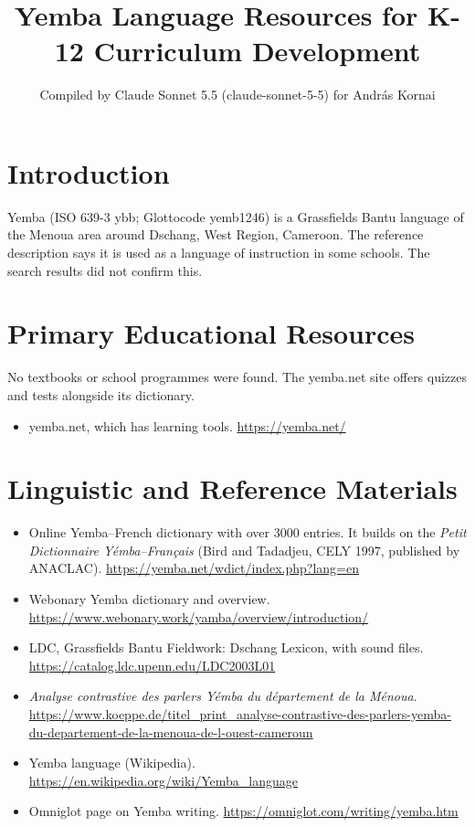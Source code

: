 \documentclass[12pt]{article}
\title{Yemba Language Resources for K-12 Curriculum Development}
\author{Compiled by Claude Sonnet 5.5 (claude-sonnet-5-5) for Andr\'as Kornai}
\date{}
\begin{document}
\maketitle

\section{Introduction}
Yemba (ISO 639-3 ybb; Glottocode yemb1246) is a Grassfields Bantu language of the Menoua area around Dschang, West Region, Cameroon. The reference description says it is used as a language of instruction in some schools. The search results did not confirm this.

\section{Primary Educational Resources}
No textbooks or school programmes were found. The yemba.net site offers quizzes and tests alongside its dictionary.
\begin{itemize}
\item yemba.net, which has learning tools. \url{https://yemba.net/}
\end{itemize}

\section{Linguistic and Reference Materials}
\begin{itemize}
\item Online Yemba--French dictionary with over 3000 entries. It builds on the \emph{Petit Dictionnaire Y\'emba--Fran\c{c}ais} (Bird and Tadadjeu, CELY 1997, published by ANACLAC). \url{https://yemba.net/wdict/index.php?lang=en}
\item Webonary Yemba dictionary and overview. \url{https://www.webonary.work/yamba/overview/introduction/}
\item LDC, Grassfields Bantu Fieldwork: Dschang Lexicon, with sound files. \url{https://catalog.ldc.upenn.edu/LDC2003L01}
\item \emph{Analyse contrastive des parlers Y\'emba du d\'epartement de la M\'enoua}. \url{https://www.koeppe.de/titel_print_analyse-contrastive-des-parlers-yemba-du-departement-de-la-menoua-de-l-ouest-cameroun}
\item Yemba language (Wikipedia). \url{https://en.wikipedia.org/wiki/Yemba_language}
\item Omniglot page on Yemba writing. \url{https://omniglot.com/writing/yemba.htm}
\end{itemize}
\end{document}
